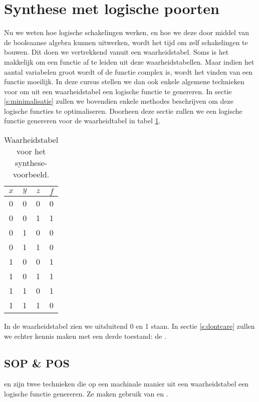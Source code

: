 \section{Synthese met logische poorten}
\label{s:synthese}
Nu we weten hoe logische schakelingen werken, en hoe we deze door middel van de booleaanse algebra kunnen uitwerken, wordt het tijd om zelf schakelingen te bouwen. Dit doen we vertrekkend vanuit een waarheidstabel. Soms is het makkelijk om een functie af te leiden uit deze waarheidstabellen. Maar indien het aantal variabelen groot wordt of de functie complex is, wordt het vinden van een functie moeilijk. In deze cursus stellen we dan ook enkele algemene technieken voor om uit een waarheidstabel een logische functie te genereren. In sectie \ref{s:minimalisatie} zullen we bovendien enkele methodes beschrijven om deze logische functies te optimaliseren. Doorheen deze sectie zullen we een logische functie genereren voor de waarheidtabel in tabel \ref{tbl:truthTableExample}.
\begin{table}[htb]
\centering
\begin{tabular}{ccc|c}
$x$&$y$&$z$&$f$\\\hline
0&0&0&0\\
0&0&1&1\\
0&1&0&0\\
0&1&1&0\\
1&0&0&1\\
1&0&1&1\\
1&1&0&1\\
1&1&1&0\\
\end{tabular}
\caption{Waarheidstabel voor het synthese-voorbeeld.}
\label{tbl:truthTableExample}
\end{table}
In de waarheidstabel zien we uitsluitend 0 en 1 staan. In sectie \ref{s:dontcare} zullen we echter kennis maken met een derde toestand: de .
\subsection{SOP \& POS}
 en  zijn twee technieken die op een machinale manier uit een waarheidstabel een logische functie genereren. Ze maken gebruik van  en .
